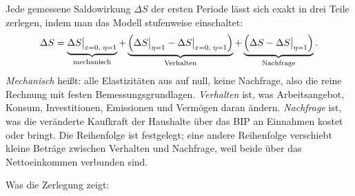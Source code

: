 Jede gemessene Saldowirkung $\Delta S$ der ersten Periode lässt sich exakt in drei Teile
zerlegen, indem man das Modell stufenweise einschaltet:
\begin{equation}
\Delta S=\underbrace{\Delta S\big|_{\varepsilon=0,\;\eta=1}}_{\text{mechanisch}}
+\underbrace{\Bigl(\Delta S\big|_{\eta=1}-\Delta S\big|_{\varepsilon=0,\;\eta=1}\Bigr)}_{\text{Verhalten}}
+\underbrace{\Bigl(\Delta S-\Delta S\big|_{\eta=1}\Bigr)}_{\text{Nachfrage}}.
\end{equation}
\emph{Mechanisch} heißt: alle Elastizitäten aus  auf null, keine Nachfrage, also
die reine Rechnung mit festen Bemessungsgrundlagen. \emph{Verhalten} ist, was Arbeitsangebot,
Konsum, Investitionen, Emissionen und Vermögen daran ändern. \emph{Nachfrage} ist, was die
veränderte Kaufkraft der Haushalte über das BIP an Einnahmen kostet oder bringt. Die
Reihenfolge ist festgelegt; eine andere Reihenfolge verschiebt kleine Beträge zwischen
Verhalten und Nachfrage, weil beide über das Nettoeinkommen verbunden sind.

\begin{table}[!htb]
\centering\footnotesize
\setlength{\tabcolsep}{4pt}

\caption{Zerlegung der Saldowirkung in der ersten Periode (2025--2028, Jahreswert). Oben die
Stellgrößen am Tisch, unten die der klassischen Fläche. Anteile nur, wo die Gesamtwirkung
mindestens 0,05\,\Mrd{} beträgt.}
\label{tab:zerlegung}
\end{table}

Was die Zerlegung zeigt:

